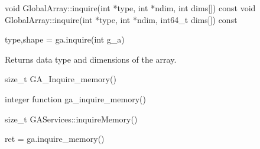 \documentclass[10pt]{article}
\begin{document}
\begin{cxxapi}
\begin{cxxcode}
void GlobalArray::inquire(int *type, int *ndim, int dims[]) const
void GlobalArray::inquire(int *type, int *ndim, int64_t dims[]) const
\end{cxxcode}
\begin{funcargs}
\end{funcargs}
\end{cxxapi}

\begin{pyapi}
\begin{pycode}
type,shape = ga.inquire(int g_a)
\end{pycode}
\begin{funcargs}
\end{funcargs}
\end{pyapi}

\local

\begin{desc}

Returns data type and dimensions of the array.

\end{desc}


\begin{capi}
\begin{ccode}
size_t GA_Inquire_memory()
\end{ccode}
\end{capi}

\begin{fapi}
\begin{fcode}
integer function ga_inquire_memory()
\end{fcode}
\end{fapi}

\begin{cxxapi}
\begin{cxxcode}
size_t GAServices::inquireMemory()
\end{cxxcode}
\end{cxxapi}

\begin{pyapi}
\begin{pycode}
ret = ga.inquire_memory()
\end{pycode}
\end{pyapi}
\end{document}
